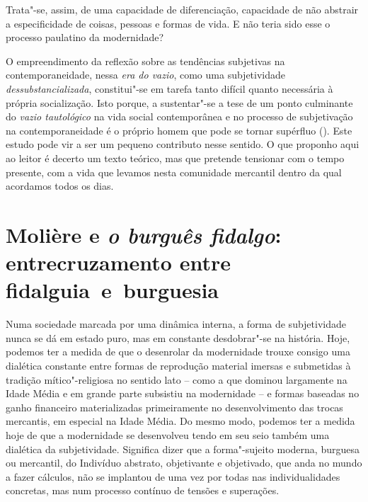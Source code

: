 Trata"-se, assim, de uma capacidade de diferenciação, capacidade de não
abstrair a especificidade de coisas, pessoas e formas de vida. E não
teria sido esse o processo paulatino da modernidade?

O empreendimento da reflexão sobre as tendências subjetivas na
contemporaneidade, nessa \emph{era do vazio}, como uma subjetividade
\emph{dessubstancializada}, constitui"-se em tarefa tanto difícil quanto
necessária à própria socialização. Isto porque, a sustentar"-se a
tese de um ponto culminante do \emph{vazio tautológico} na vida social
contemporânea e no processo de subjetivação na contemporaneidade é o próprio homem que
pode se tornar supérfluo (). Este estudo pode vir a ser um pequeno
contributo nesse sentido. O que proponho aqui ao leitor é decerto um texto teórico,
mas que pretende tensionar com o tempo presente, com a vida que levamos nesta
comunidade mercantil dentro da qual acordamos todos os dias.

\chapter*{Molière e \emph{o burguês fidalgo}: entrecruzamento entre fidalguia~e~burguesia}

Numa sociedade marcada por uma dinâmica interna, a forma de
subjetividade nunca se dá em estado puro, mas em constante desdobrar"-se
na história. Hoje, podemos ter a medida de que o desenrolar da
modernidade trouxe consigo uma dialética constante entre formas de
reprodução material imersas e submetidas à tradição mítico"-religiosa no
sentido lato -- como a que dominou largamente na Idade Média e em grande
parte subsistiu na modernidade -- e formas baseadas no ganho financeiro
materializadas primeiramente no desenvolvimento das trocas mercantis, em
especial na Idade Média. Do mesmo modo, podemos ter a medida hoje de que
a modernidade se desenvolveu tendo em seu seio também uma dialética da
subjetividade. Significa dizer que a forma"-sujeito moderna, burguesa ou
mercantil, do Indivíduo abstrato, objetivante e objetivado, que anda no
mundo a fazer cálculos, não se implantou de
uma vez por todas nas individualidades concretas, mas num processo
contínuo de tensões e superações.

